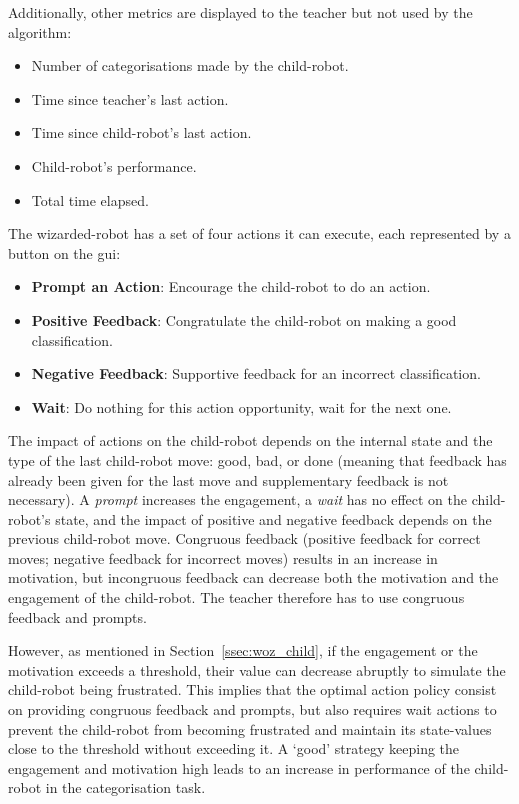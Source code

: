 Additionally, other metrics are displayed to the teacher but not used by the algorithm:
\begin{itemize}
	\item Number of categorisations made by the child-robot.
	\item Time since teacher's last action.
	\item Time since child-robot's last action.
	\item Child-robot's performance.
	\item Total time elapsed.
\end{itemize}


The wizarded-robot has a set of four actions it can execute, each represented by a button on the \gls{gui}: 
\begin{itemize}
	\item \textbf{Prompt an Action}: Encourage the child-robot to do an action.
	\item \textbf{Positive Feedback}: Congratulate the child-robot on making a good classification.
	\item \textbf{Negative Feedback}: Supportive feedback for an incorrect classification.
	\item \textbf{Wait}: Do nothing for this action opportunity, wait for the next one.
\end{itemize}


The impact of actions on the child-robot depends on the internal state and the type of the last child-robot move: good, bad, or done (meaning that feedback has already been given for the last move and supplementary feedback is not necessary). A \textit{prompt} increases the engagement, a \textit{wait} has no effect on the child-robot's state, and the impact of positive and negative feedback depends on the previous child-robot move. Congruous feedback (positive feedback for correct moves; negative feedback for incorrect moves) results in an increase in motivation, but incongruous feedback can decrease both the motivation and the engagement of the child-robot. The teacher therefore has to use congruous feedback and prompts.

However, as mentioned in Section~\ref{ssec:woz_child}, if the engagement or the motivation exceeds a threshold, their value can decrease abruptly to simulate the child-robot being frustrated. This implies that the optimal action policy consist on providing congruous feedback and prompts, but also requires wait actions to prevent the child-robot from becoming frustrated and maintain its state-values close to the threshold without exceeding it. A `good' strategy keeping the engagement and motivation high leads to an increase in performance of the child-robot in the categorisation task.

